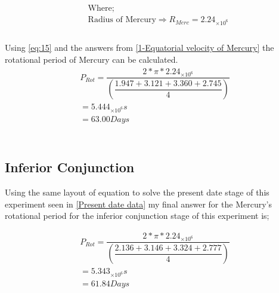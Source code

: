 \documentclass[11pt]{article}
\begin{document}
\begin{multicols}{2}
\begin{equation*}
\begin{split}
&\text{Where;} \\
&\text{Radius of Mercury} \Rightarrow {R_{Merc}}=2.24_{\times10^6} \\
\end{split}
\end{equation*} \\

Using \cref{eq:15} and the answers from \cref{1-Equatorial velocity of Mercury} the rotational period of Mercury can be calculated. \\

\begin{equation} \label{1-Planet rotational period}
\begin{split}
{P_{Rot} =\dfrac{2 * \pi * 2.24_{\times10^6}}{\left(\dfrac{1.947+3.121+3.360+2.745}{4}\right)}} \\
= 5.444_{\times10^6}s \\
= 63.00 Days \\
\end{split}
\end{equation} \\


\subsection{Inferior Conjunction}\label{Inferior Conjunction}

Using the same layout of equation to solve the present date stage of this experiment seen in \cref{Present date data} my final answer for the Mercury's rotational period for the inferior conjunction stage of this experiment is;

\begin{equation} \label{2-Planet rotational period}
\begin{split}
{P_{Rot} =\dfrac{2 * \pi * 2.24_{\times10^6}}{\left(\dfrac{2.136+3.146+3.324+2.777}{4}\right)}} \\
= 5.343_{\times10^6}s \\
= 61.84 Days \\
\end{split}
\end{equation} \\


\end{multicols}
\end{document}
